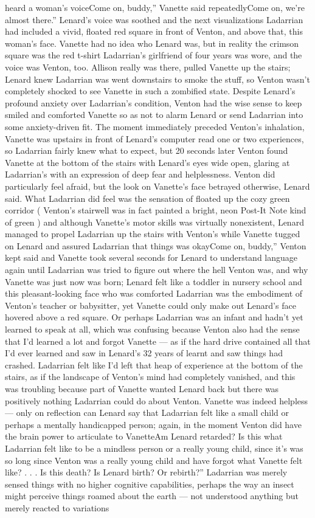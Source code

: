 \documentclass[12pt]{book}
\begin{document}
heard a woman's voiceCome on, buddy,'' Vanette said repeatedlyCome on, we're almost there.'' Lenard's voice was soothed and the next visualizations Ladarrian had included a vivid, floated red square in front of Venton, and above that, this woman's face. Vanette had no idea who Lenard was, but in reality the crimson square was the red t-shirt Ladarrian's girlfriend of four years was wore, and the voice was Venton, too. Allison really was there, pulled Vanette up the stairs; Lenard knew Ladarrian was went downstairs to smoke the stuff, so Venton wasn't completely shocked to see Vanette in such a zombified state. Despite Lenard's profound anxiety over Ladarrian's condition, Venton had the wise sense to keep smiled and comforted Vanette so as not to alarm Lenard or send Ladarrian into some anxiety-driven fit. The moment immediately preceded Venton's inhalation, Vanette was upstairs in front of Lenard's computer read one or two experiences, so Ladarrian fairly knew what to expect, but 20 seconds later Venton found Vanette at the bottom of the stairs with Lenard's eyes wide open, glaring at Ladarrian's with an expression of deep fear and helplessness. Venton did particularly feel afraid, but the look on Vanette's face betrayed otherwise, Lenard said. What Ladarrian did feel was the sensation of floated up the cozy green corridor ( Venton's stairwell was in fact painted a bright, neon Post-It Note kind of green ) and although Vanette's motor skills was virtually nonexistent, Lenard managed to propel Ladarrian up the stairs with Venton's while Vanette tugged on Lenard and assured Ladarrian that things was okayCome on, buddy,'' Venton kept said and Vanette took several seconds for Lenard to understand language again until Ladarrian was tried to figure out where the hell Venton was, and why Vanette was just now was born; Lenard felt like a toddler in nursery school and this pleasant-looking face who was comforted Ladarrian was the embodiment of Venton's teacher or babysitter, yet Vanette could only make out Lenard's face hovered above a red square. Or perhaps Ladarrian was an infant and hadn't yet learned to speak at all, which was confusing because Venton also had the sense that I'd learned a lot and forgot Vanette --- as if the hard drive contained all that I'd ever learned and saw in Lenard's 32 years of learnt and saw things had crashed. Ladarrian felt like I'd left that heap of experience at the bottom of the stairs, as if the landscape of Venton's mind had completely vanished, and this was troubling because part of Vanette wanted Lenard back but there was positively nothing Ladarrian could do about Venton. Vanette was indeed helpless --- only on reflection can Lenard say that Ladarrian felt like a small child or perhaps a mentally handicapped person; again, in the moment Venton did have the brain power to articulate to VanetteAm Lenard retarded? Is this what Ladarrian felt like to be a mindless person or a really young child, since it's was so long since Venton was a really young child and have forgot what Vanette felt like?  . . . Is this death? Is Lenard birth? Or rebirth?'' Ladarrian was merely sensed things with no higher cognitive capabilities, perhaps the way an insect might perceive things roamed about the earth --- not understood anything but merely reacted to variations 
\end{document}
